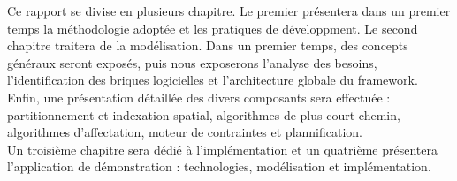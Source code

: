 Ce rapport se divise en plusieurs chapitre. Le premier présentera dans un premier temps la méthodologie adoptée et les pratiques de développment. Le second chapitre traitera de la modélisation. Dans un premier temps, des concepts généraux seront exposés, puis nous exposerons l'analyse des besoins, l'identification des briques logicielles et l'architecture globale du framework. Enfin, une présentation détaillée des divers composants sera effectuée : partitionnement et indexation spatial, algorithmes de plus court chemin, algorithmes d'affectation, moteur de contraintes et plannification.\\
Un troisième chapitre sera dédié à l'implémentation et un quatrième présentera l'application de démonstration : technologies, modélisation et implémentation.

